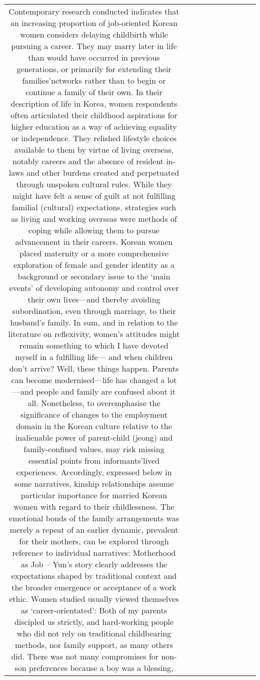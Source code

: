 \begin{table}[h!]
\begin{tabular}{|c|c|c|c|c|c|c|c|c|c|}
{Contemporary research conducted indicates that an increasing proportion of job-oriented Korean women considers delaying childbirth while pursuing a career. They may marry later in life than would have occurred in previous generations, or primarily for extending their families’networks rather than to begin or continue a family of their own.
In their description of life in Korea, women respondents often articulated their childhood aspirations for higher education as a way of achieving equality or independence. They relished lifestyle choices available to them by virtue of living overseas, notably careers and the absence of resident in-laws and other burdens created and perpetuated through unspoken cultural rules. While they might have felt a sense of guilt at not fulfilling familial (cultural) expectations, strategies such as living and working overseas were methods of coping while allowing them to pursue advancement in their careers. Korean women placed maternity or a more comprehensive exploration of female and gender identity as a background or secondary issue to the ‘main events’ of developing autonomy and control over their own lives—and thereby avoiding subordination, even through marriage, to their husband’s family. In sum, and in relation to the literature on reflexivity, women’s attitudes might remain something to which I have devoted myself in a fulfilling life— and when children don’t arrive? Well, these things happen. Parents can become modernised—life has changed a lot—and people and family are confused about it all.
Nonetheless, to overemphasise the significance of changes to the employment domain in the Korean culture relative to the inalienable power of parent-child (jeong) and family-confined values, may risk missing essential points from informants’lived experiences. Accordingly, expressed below in some narratives, kinship relationships assume particular importance for married Korean women with regard to their childlessness. The emotional bonds of the family arrangements was merely a repeat of an earlier dynamic, prevalent for their mothers, can be explored through reference to individual narratives:
Motherhood as Job --
Yun’s story clearly addresses the expectations shaped by traditional context and the broader emergence or acceptance of a work ethic. Women studied usually viewed themselves as ‘career-orientated’:
Both of my parents discipled us strictly, and hard-working people who did not rely
on traditional childbearing methods, nor family support, as many others did. There
was not many compromises for non-son preferences because a boy was a blessing,
}
\end{tabular}
\end{table}
